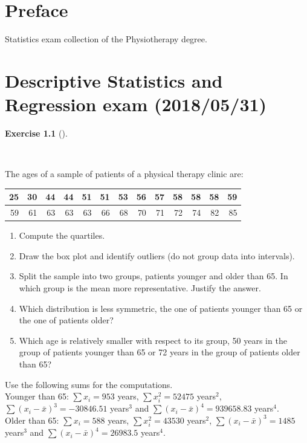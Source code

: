 \documentclass[
  a4paper,
]{scrreport}
\theoremstyle{definition}
\newtheorem{exercise}{Exercise}[chapter]
\theoremstyle{remark}
\begin{document}
\hypertarget{preface}{%
\chapter*{Preface}\label{preface}}


Statistics exam collection of the Physiotherapy degree.


\hypertarget{descriptive-statistics-and-regression-exam-20180531}{%
\chapter{Descriptive Statistics and Regression exam
(2018/05/31)}\label{descriptive-statistics-and-regression-exam-20180531}}

\leavevmode{}%
\begin{exercise}[]\label{exr-1}

~

The ages of a sample of patients of a physical therapy clinic are:

\begin{table}
\centering
\begin{tabular}{r|r|r|r|r|r|r|r|r|r|r|r|r}
\hline
25 & 30 & 44 & 44 & 51 & 51 & 53 & 56 & 57 & 58 & 58 & 58 & 59\\
\hline
59 & 61 & 63 & 63 & 63 & 66 & 68 & 70 & 71 & 72 & 74 & 82 & 85\\
\hline
\end{tabular}
\end{table}

\begin{enumerate}
\def\labelenumi{\alph{enumi}.}
\item
  Compute the quartiles.
\item
  Draw the box plot and identify outliers (do not group data into
  intervals).
\item
  Split the sample into two groups, patients younger and older than 65.
  In which group is the mean more representative. Justify the answer.
\item
  Which distribution is less symmetric, the one of patients younger than
  65 or the one of patients older?
\item
  Which age is relatively smaller with respect to its group, 50 years in
  the group of patients younger than 65 or 72 years in the group of
  patients older than 65?
\end{enumerate}

Use the following sums for the computations.\\
Younger than 65: \(\sum x_i=953\) years, \(\sum x_i^2=52475\)
years\(^2\), \(\sum (x_i-\bar x)^3=-30846.51\) years\(^3\) and
\(\sum (x_i-\bar x)^4=939658.83\) years\(^4\).\\
Older than 65: \(\sum x_i=588\) years, \(\sum x_i^2=43530\) years\(^2\),
\(\sum (x_i-\bar x)^3=1485\) years\(^3\) and
\(\sum (x_i-\bar x)^4=26983.5\) years\(^4\).

\end{exercise}
\end{document}
